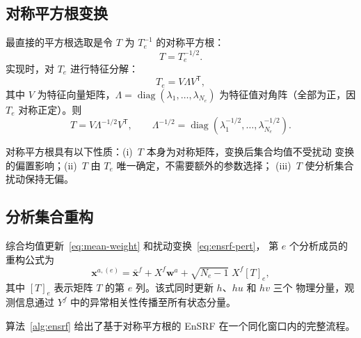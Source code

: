 \documentclass[12pt,a4paper]{article}
\newcommand{\x}{\bm{x}}
\newcommand{\w}{\bm{w}}
\newcommand{\T}{^{\mathsf T}}
\begin{document}
\subsection{对称平方根变换}

最直接的平方根选取是令 $T$ 为 $T_e^{-1}$ 的对称平方根：
\begin{equation}
  T = T_e^{-1/2}.
  \label{eq:sym-sqrt}
\end{equation}
实现时，对 $T_e$ 进行特征分解：
\begin{equation}
  T_e = V \Lambda V\T,
  \label{eq:eigendecomp}
\end{equation}
其中 $V$ 为特征向量矩阵，$\Lambda = \operatorname{diag}(\lambda_1, \dots,
\lambda_{N_e})$ 为特征值对角阵（全部为正，因 $T_e$ 对称正定）。则
\begin{equation}
  T = V \Lambda^{-1/2} V\T,
  \qquad
  \Lambda^{-1/2} = \operatorname{diag}(\lambda_1^{-1/2}, \dots,
  \lambda_{N_e}^{-1/2}).
  \label{eq:T-symsqrt}
\end{equation}

对称平方根具有以下性质：(i)~$T$ 本身为对称矩阵，变换后集合均值不受扰动
变换的偏置影响；(ii)~$T$ 由 $T_e$ 唯一确定，不需要额外的参数选择；
(iii)~$T$ 使分析集合扰动保持无偏。

\subsection{分析集合重构}

综合均值更新~\eqref{eq:mean-weight} 和扰动变换~\eqref{eq:ensrf-pert}，
第 $e$ 个分析成员的重构公式为
\begin{equation}
  \x^{a,(e)}
  = \bar{\x}^f
  + X^f \w^a
  + \sqrt{N_e - 1}\; X^f [T]_e,
  \label{eq:ensrf-reconstruct}
\end{equation}
其中 $[T]_e$ 表示矩阵 $T$ 的第 $e$ 列。该式同时更新 $h$、$hu$ 和 $hv$ 三个
物理分量，观测信息通过 $Y^f$ 中的异常相关性传播至所有状态分量。

算法~\ref{alg:ensrf} 给出了基于对称平方根的 EnSRF 在一个同化窗口内的完整流程。
\end{document}

